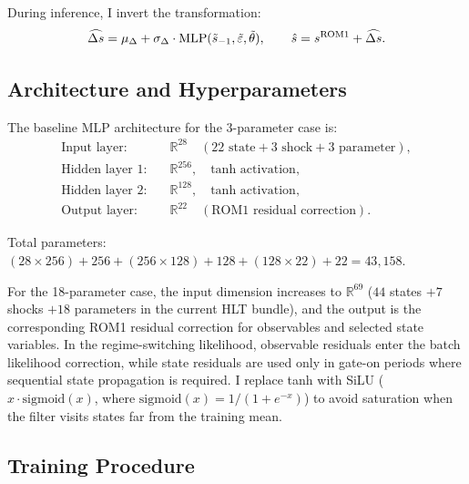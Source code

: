 \documentclass[12pt]{article}
\theoremstyle{plain}
\theoremstyle{definition}
\theoremstyle{remark}
\newcommand{\eps}{\varepsilon}
\begin{document}
During inference, I invert the transformation:
\begin{equation}
\widehat{\Delta s} = \mu_{\Delta} + \sigma_{\Delta} \cdot \text{MLP}(\tilde{s}_{-1}, \tilde{\eps}, \tilde{\theta}), \qquad
\hat{s} = s^{\rm ROM1} + \widehat{\Delta s}.
\end{equation}


\subsection{Architecture and Hyperparameters}

The baseline MLP architecture for the 3-parameter case is:
\begin{align}
\text{Input layer:} \quad & \mathbb{R}^{28} \quad (22 \text{ state} + 3 \text{ shock} + 3 \text{ parameter}), \\
\text{Hidden layer 1:} \quad & \mathbb{R}^{256}, \quad \text{tanh activation}, \\
\text{Hidden layer 2:} \quad & \mathbb{R}^{128}, \quad \text{tanh activation}, \\
\text{Output layer:} \quad & \mathbb{R}^{22} \quad (\text{ROM1 residual correction}).
\end{align}

Total parameters: $(28 \times 256) + 256 + (256 \times 128) + 128 + (128 \times 22) + 22 = 43{,}158$.

For the 18-parameter case, the input dimension increases to $\mathbb{R}^{69}$ ($44$ states $+ 7$ shocks $+ 18$ parameters in the current HLT bundle), and the output is the corresponding ROM1 residual correction for observables and selected state variables. In the regime-switching likelihood, observable residuals enter the batch likelihood correction, while state residuals are used only in gate-on periods where sequential state propagation is required. I replace tanh with SiLU ($x \cdot \text{sigmoid}(x)$, where $\text{sigmoid}(x) = 1/(1+e^{-x})$) to avoid saturation when the filter visits states far from the training mean.


\subsection{Training Procedure}
\end{document}

